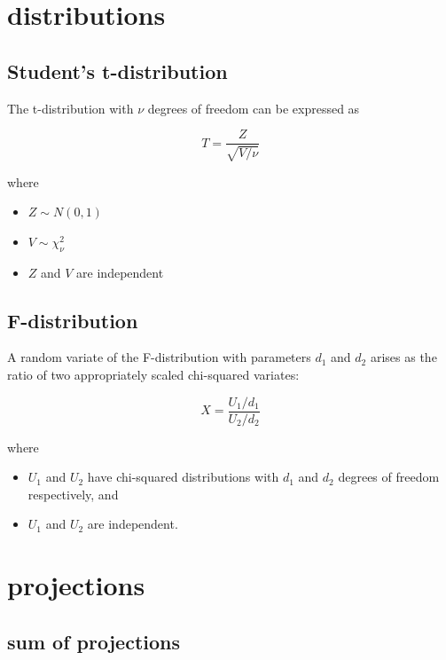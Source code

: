 \documentclass{article}
\begin{document}
\begin{appendices}
\section{distributions}

\subsection{Student's t-distribution}

The t-distribution with $\nu$ degrees of freedom can be expressed as

\begin{equation} \label{eq:t_distribution}
    T = \frac{Z}{\sqrt{V/\nu}}
\end{equation}

where

\begin{itemize}
    \item $Z\sim N(0,1)$
    \item $V\sim \chi_{\nu}^{2}$
    \item $Z$ and $V$ are independent
\end{itemize}

\subsection{F-distribution} \label{app:F_distribution}

A random variate of the F-distribution with parameters $d_1$ and $d_2$ arises as the ratio of two appropriately scaled chi-squared variates:

\begin{equation}
    X = \frac{U_1 / d_1}{U_2 / d_2}
\end{equation}

where

\begin{itemize}
    \item $U_{1}$ and $U_{2}$ have chi-squared distributions with $d_{1}$ and $d_{2}$ degrees of freedom respectively, and
    \item $U_{1}$ and $U_{2}$ are independent.
\end{itemize}

\section{projections}

\subsection{sum of projections}


\end{appendices}
\end{document}

